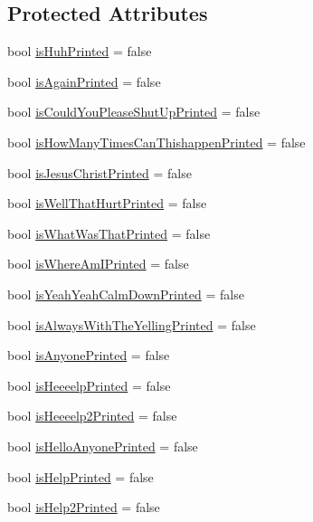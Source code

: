 \subsection*{Protected Attributes}
\begin{DoxyCompactItemize}
\item 
bool \hyperlink{classDialogue_afc51238031a3b5e1cf32e008d11c03c8}{is\+Huh\+Printed} = false
\item 
bool \hyperlink{classDialogue_a156b482fc8d9ec868117e0ff1e111325}{is\+Again\+Printed} = false
\item 
bool \hyperlink{classDialogue_aec5f0f752dfe066658be15ad55e7cc18}{is\+Could\+You\+Please\+Shut\+Up\+Printed} = false
\item 
bool \hyperlink{classDialogue_a24253923b1e9e6f70e5be528a7550c5f}{is\+How\+Many\+Times\+Can\+Thishappen\+Printed} = false
\item 
bool \hyperlink{classDialogue_a54544b789f4b8a06542f20c37ce6b2e0}{is\+Jesus\+Christ\+Printed} = false
\item 
bool \hyperlink{classDialogue_aee628abf92b70ef212616e38d0816e82}{is\+Well\+That\+Hurt\+Printed} = false
\item 
bool \hyperlink{classDialogue_aa11d331eac3633cfee6e580fb838e9ef}{is\+What\+Was\+That\+Printed} = false
\item 
bool \hyperlink{classDialogue_a899dd954c7bd34a08abf802818f2765f}{is\+Where\+Am\+I\+Printed} = false
\item 
bool \hyperlink{classDialogue_af4b000d93c07ec502f6d2e345e4d1099}{is\+Yeah\+Yeah\+Calm\+Down\+Printed} = false
\item 
bool \hyperlink{classDialogue_a068902d456ee99ed23d2849d4e66a917}{is\+Always\+With\+The\+Yelling\+Printed} = false
\item 
bool \hyperlink{classDialogue_a8900da2be3d702f726678a32404f0258}{is\+Anyone\+Printed} = false
\item 
bool \hyperlink{classDialogue_ad4110b8446ddc8c6c3b2371f53b081d0}{is\+Heeeelp\+Printed} = false
\item 
bool \hyperlink{classDialogue_a51700a11ffc543cbf5b71b753be4e7ed}{is\+Heeeelp2\+Printed} = false
\item 
bool \hyperlink{classDialogue_a193ea1e69825aa86a987ae20d580dd09}{is\+Hello\+Anyone\+Printed} = false
\item 
bool \hyperlink{classDialogue_a852fcfebbb5f7aac29ce4338205f3b0f}{is\+Help\+Printed} = false
\item 
bool \hyperlink{classDialogue_ad2233869defe9632464912f8ebc0d1e8}{is\+Help2\+Printed} = false

\end{DoxyCompactItemize}
